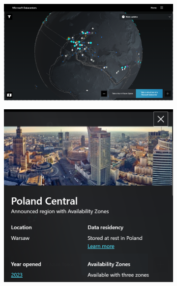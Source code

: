 \begin{figure}[H]
    \begin{subfigure}[m]{0.7\textwidth}
    \includegraphics[width=\textwidth]{images/azure-ic}
    \end{subfigure}
    \hfill
    \begin{subfigure}[m]{0.25\textwidth}
        \includegraphics[width=\textwidth]{images/azure-pl}
    \end{subfigure}
    \label{fig:azure-ic}
\end{figure}

